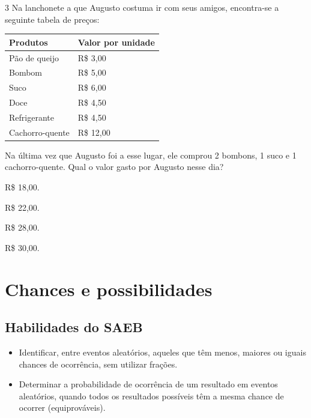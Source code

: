 \num{3} Na lanchonete a que Augusto costuma ir com seus amigos, encontra-se a
seguinte tabela de preços:

\begin{longtable}[]{@{}ll@{}}
\toprule
Produtos & Valor por unidade\tabularnewline
\midrule
\endhead
Pão de queijo & R\$ 3,00\tabularnewline
Bombom & R\$ 5,00\tabularnewline
Suco & R\$ 6,00\tabularnewline
Doce & R\$ 4,50\tabularnewline
Refrigerante & R\$ 4,50\tabularnewline
Cachorro-quente & R\$ 12,00\tabularnewline
\bottomrule
\end{longtable}

Na última vez que Augusto foi a esse lugar, ele comprou 2 bombons, 1
suco e 1 cachorro-quente. Qual o valor gasto por Augusto nesse dia?

\begin{minipage}{.5\textwidth}
\begin{escolha}
\item
  R\$ 18,00.
\item
  R\$ 22,00.
\item
  R\$ 28,00.
\item
  R\$ 30,00.
\end{escolha}
\end{minipage}

\chapter{Chances e possibilidades}


\section{Habilidades do SAEB}

\begin{itemize}
\item Identificar, entre eventos aleatórios, aqueles que têm menos, maiores ou
iguais chances de ocorrência, sem utilizar frações.

\item Determinar a probabilidade de ocorrência de um resultado em eventos
aleatórios, quando todos os resultados possíveis têm a mesma chance de
ocorrer (equiprováveis).
\end{itemize}

